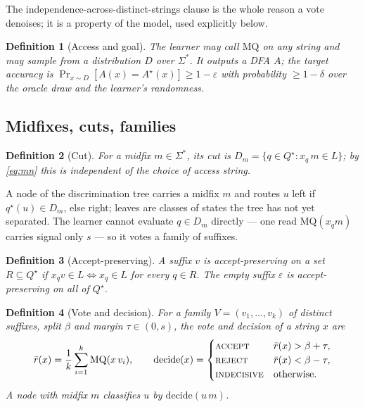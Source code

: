 \documentclass[11pt]{article}
\newtheorem{definition}{Definition}
\newcommand{\MQ}{\mathrm{MQ}}
\newcommand{\acc}{\textsc{accept}}
\newcommand{\rej}{\textsc{reject}}
\newcommand{\ind}{\textsc{indecisive}}
\begin{document}
The independence-across-distinct-strings clause is the whole reason a vote
denoises; it is a property of the model, used explicitly below.

\begin{definition}[Access and goal]\label{def:goal}
The learner may call $\MQ$ on any string and may sample from a distribution $D$
over $\Sigma^*$. It outputs a DFA $A$; the target accuracy is
$\Pr_{x\sim D}[A(x)=A^\star(x)]\ge 1-\varepsilon$ with probability $\ge 1-\delta$
over the oracle draw and the learner's randomness.
\end{definition}

\subsection{Midfixes, cuts, families}

\begin{definition}[Cut]\label{def:cut}
For a midfix $m\in\Sigma^*$, its cut is $D_m=\{q\in Q^\star : x_q\,m\in L\}$; by
\eqref{eq:mn} this is independent of the choice of access string.
\end{definition}

A node of the discrimination tree carries a midfix $m$ and routes $u$ left if
$q^\star(u)\in D_m$, else right; leaves are classes of states the tree has not yet
separated. The learner cannot evaluate $q\in D_m$ directly --- one read
$\MQ(x_q m)$ carries signal only $s$ --- so it votes a family of suffixes.

\begin{definition}[Accept-preserving]\label{def:ap}
A suffix $v$ is accept-preserving on a set $R\subseteq Q^\star$ if $x_q v\in L\iff
x_q\in L$ for every $q\in R$. The empty suffix $\varepsilon$ is accept-preserving on
all of $Q^\star$.
\end{definition}

\begin{definition}[Vote and decision]\label{def:decide}
For a family $V=(v_1,\dots,v_k)$ of distinct suffixes, split $\beta$ and margin
$\tau\in(0,s)$, the vote and decision of a string $x$ are
\[
  \bar r(x)=\frac1k\sum_{i=1}^k \MQ(x\,v_i),\qquad
  \mathrm{decide}(x)=\begin{cases}
    \acc & \bar r(x)>\beta+\tau,\\
    \rej & \bar r(x)<\beta-\tau,\\
    \ind & \text{otherwise.}
  \end{cases}
\]
A node with midfix $m$ classifies $u$ by $\mathrm{decide}(u\,m)$.
\end{definition}
\end{document}
